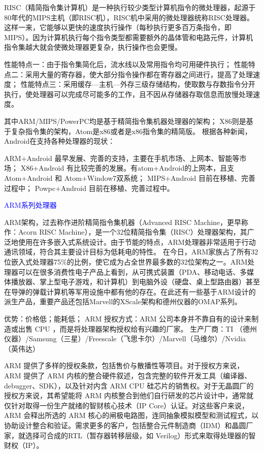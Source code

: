 \documentclass[utf8]{book}
\begin{document}
RISC（精简指令集计算机）是一种执行较少类型计算机指令的微处理器，起源于80年代的MIPS主机（即RISC机），RISC机中采用的微处理器统称RISC处理器。这样一来，它能够以更快的速度执行操作（每秒执行更多百万条指令，即MIPS）。因为计算机执行每个指令类型都需要额外的晶体管和电路元件，计算机指令集越大就会使微处理器更复杂，执行操作也会更慢。　

性能特点一：由于指令集简化后，流水线以及常用指令均可用硬件执行； 
性能特点二：采用大量的寄存器，使大部分指令操作都在寄存器之间进行，提高了处理速度； 
性能特点三：采用缓存—主机—外存三级存储结构，使取数与存数指令分开执行，使处理器可以完成尽可能多的工作，且不因从存储器存取信息而放慢处理速度。

其中ARM/MIPS/PowerPC均是基于精简指令集机器处理器的架构；
X86则是基于复杂指令集的架构，Atom是x86或者是x86指令集的精简版。
根据各种新闻，Android在支持各种处理器的现状：

ARM+Android 最早发展、完善的支持，主要在手机市场、上网本、智能等市场；
X86+Android 有比较完善的发展。有atom+Android的上网本，且支
Atom+Android 和 Atom+Window7双系统；
MIPS+Android 目前在移植、完善过程中；
Powpc+Android 目前在移植、完善过程中。

{\Large \textcolor{blue}{ARM系列处理器}}

ARM架构，过去称作进阶精简指令集机器（Advanced RISC Machine，更早称作：Acorn RISC Machine），是一个32位精简指令集（RISC）处理器架构，其广泛地使用在许多嵌入式系统设计。由于节能的特点，ARM处理器非常适用于行动通讯领域，符合其主要设计目标为低耗电的特性。
在今日，ARM家族占了所有32位嵌入式处理器75\%的比例，使它成为占全世界最多数的32位架构之一。ARM处理器可以在很多消费性电子产品上看到，从可携式装置（PDA、移动电话、多媒体播放器、掌上型电子游戏，和计算机）到电脑外设（硬盘、桌上型路由器）甚至在导弹的弹载计算机等军用设施中都有他的存在。在此还有一些基于ARM设计的派生产品，重要产品还包括Marvell的XScale架构和德州仪器的OMAP系列。

优势：价格低；能耗低；
ARM 授权方式：ARM 公司本身并不靠自有的设计来制造或出售 CPU ，而是将处理器架构授权给有兴趣的厂家。
生产厂商：TI （德州仪器）/Samsung（三星）/Freescale（飞思卡尔）/Marvell（马维尔）/Nvidia（英伟达）

ARM 提供了多样的授权条款，包括售价与散播性等项目。对于授权方来说，ARM 提供了 ARM 内核的整合硬件叙述，包含完整的软件开发工具（编译器、debugger、SDK），以及针对内含 ARM CPU 硅芯片的销售权。对于无晶圆厂的授权方来说，其希望能将 ARM 内核整合到他们自行研发的芯片设计中，通常就仅针对取得一份生产就绪的智财核心技术（IP Core）认证。对这些客户来说，ARM 会释出所选的 ARM 核心的闸极电路图，连同抽象模拟模型和测试程式，以协助设计整合和验证。需求更多的客户，包括整合元件制造商（IDM）和晶圆厂家，就选择可合成的RTL（暂存器转移层级，如 Verilog）形式来取得处理器的智财权（IP）。
\end{document}
